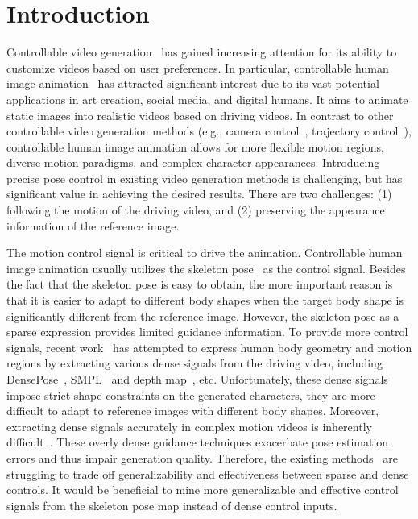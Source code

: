 
\section{Introduction}
Controllable video generation~\citep{zhang2023controlvideo,yin2023dragnuwa, wang2024motionctrl,niu2025mofa,gu2024videoswap} has gained increasing attention for its ability to customize videos based on user preferences. In particular, controllable human image animation~\citep{hu2023animate,wang2024disco} has attracted significant interest due to its vast potential applications in art creation, social media, and digital humans. It aims to animate static images into realistic videos based on driving videos.
In contrast to other controllable video generation methods (e.g., camera control~\citep{he2024cameractrl, wang2024motionctrl, li2024image}, trajectory control~\citep{yin2023dragnuwa,wu2024draganything, wang2024motionctrl, li2024image}), controllable human image animation allows for more flexible motion regions, diverse motion paradigms, and complex character appearances.
Introducing precise pose control in existing video generation methods is challenging, but has significant value in achieving the desired results.
There are two challenges: (1) following the motion of the driving video, and (2) preserving the appearance information of the reference image.

The motion control signal is critical to drive the animation. Controllable human image animation usually utilizes the skeleton pose~\citep{yang2023dwpose} as the control signal. Besides the fact that the skeleton pose is easy to obtain, the more important reason is that it is easier to adapt to different body shapes when the target body shape is significantly different from the reference image.
However, the skeleton pose as a sparse expression provides limited guidance information.
To provide more control signals, recent work~\citep{zhu2024champ,xu2024magicanimate} has attempted to express human body geometry and motion regions by extracting various dense signals from the driving video, including DensePose~\citep{guler2018densepose}, SMPL~\citep{SMPL:2015} and depth map~\citep{yang2024depth}, etc. Unfortunately, these dense signals impose strict shape constraints on the generated characters, they are more difficult to adapt to reference images with different body shapes. Moreover, extracting dense signals accurately in complex motion videos is inherently difficult~\citep{zhang2024mimicmotion}. These overly dense guidance techniques exacerbate pose estimation errors and thus impair generation quality.
Therefore, the existing methods~\citep{chang2023magicpose, hu2023animate, zhu2024champ, wang2024disco} are struggling to trade off generalizability and effectiveness between sparse and dense controls.
It would be beneficial to mine more generalizable and effective control signals from the skeleton pose map instead of dense control inputs.

